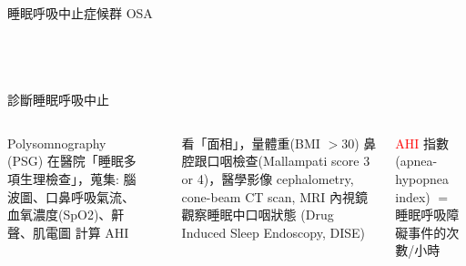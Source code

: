 \documentclass[aspectratio=169]{beamer}
\begin{document}
\begin{frame}{睡眠呼吸中止症候群 OSA}
\begin{columns}{~}
\begin{tikzpicture}
\end{tikzpicture}

\end{columns}

\end{frame}


\begin{frame}{診斷睡眠呼吸中止}
\begin{columns}
        \begin{outline}
        \1 Polysomnography (PSG) 在醫院「睡眠多項生理檢查」，蒐集:
        \2 腦波圖、口鼻呼吸氣流、血氧濃度(SpO2)、鼾聲、肌電圖
        \2 計算 AHI

        \end{outline}
~\\    
~\\
~\\
~\\
~\\
~\\
        \begin{outline}
        \1 看「面相」，量體重(BMI $> 30$)
        \1 鼻腔跟口咽檢查(Mallampati score 3 or 4)，醫學影像
        \2 cephalometry, cone-beam CT scan, MRI
        \1 內視鏡觀察睡眠中口咽狀態 (Drug Induced Sleep Endoscopy, DISE) 
    \end{outline}
    
    \textcolor{red}{AHI} 指數(apnea-hypopnea index) $=$ 睡眠呼吸障礙事件的次數/小時
    ~\\
    ~\\
        \centering


\end{columns}
\end{frame}
\end{document}
